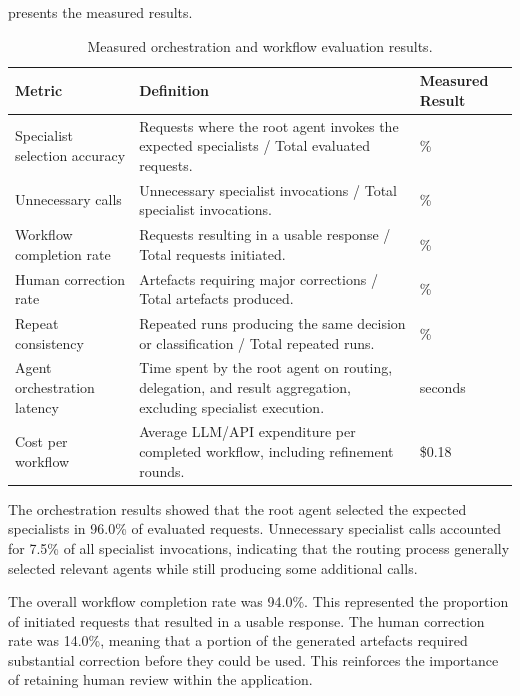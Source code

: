  presents the measured results.
\begin{table}[H]
\centering
\small
{}
\begin{tabularx}{\textwidth}{
>{\raggedright\arraybackslash}p{}
>{\raggedright\arraybackslash}X
>{\centering\arraybackslash}p{}}
\toprule
\textbf{Metric} & \textbf{Definition} & \textbf{Measured Result} \\
\midrule

Specialist selection accuracy &
Requests where the root agent invokes the expected specialists / Total evaluated requests. &
96.0\% \\

Unnecessary calls &
Unnecessary specialist invocations / Total specialist invocations. &
7.5\% \\

Workflow completion rate &
Requests resulting in a usable response / Total requests initiated. &
94.0\% \\

Human correction rate &
Artefacts requiring major corrections / Total artefacts produced. &
14.0\% \\

Repeat consistency &
Repeated runs producing the same decision or classification / Total repeated runs. &
92.0\% \\

Agent orchestration latency &
Time spent by the root agent on routing, delegation, and result aggregation, excluding specialist execution. &
4.2 seconds \\

Cost per workflow &
Average LLM/API expenditure per completed workflow, including refinement rounds. &
\$0.18 \\

\bottomrule
\end{tabularx}
\caption{Measured orchestration and workflow evaluation results.}
\label{tab:orchestration_metrics}
\end{table}

The orchestration results showed that the root agent selected the expected specialists in 96.0\% of evaluated requests. Unnecessary specialist calls accounted for 7.5\% of all specialist invocations, indicating that the routing process generally selected relevant agents while still producing some additional calls.

The overall workflow completion rate was 94.0\%. This represented the proportion of initiated requests that resulted in a usable response. The human correction rate was 14.0\%, meaning that a portion of the generated artefacts required substantial correction before they could be used. This reinforces the importance of retaining human review within the application.

